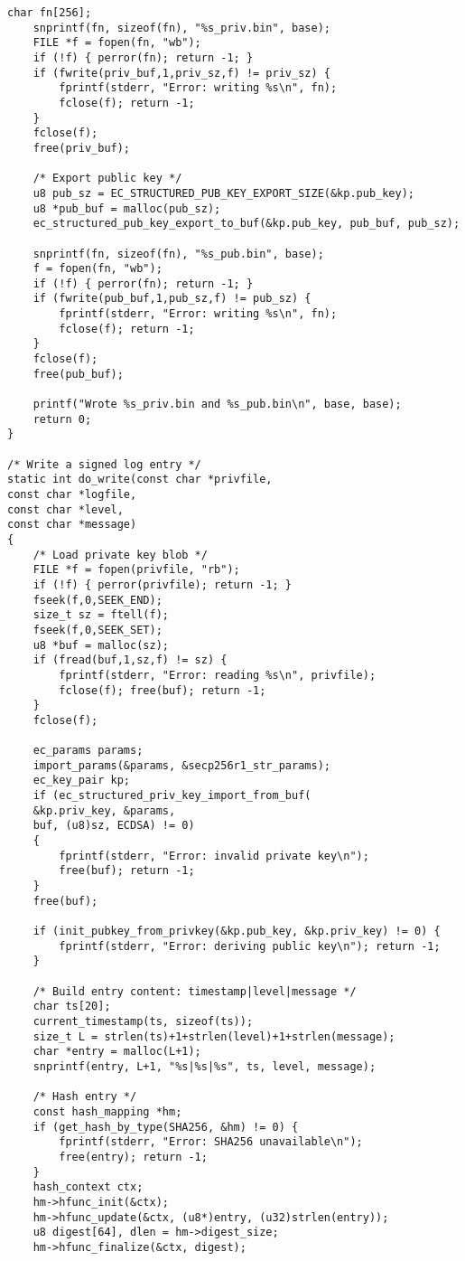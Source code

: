 \begin{lstlisting}[style=cstyle]
	char fn[256];
	snprintf(fn, sizeof(fn), "%s_priv.bin", base);
	FILE *f = fopen(fn, "wb");
	if (!f) { perror(fn); return -1; }
	if (fwrite(priv_buf,1,priv_sz,f) != priv_sz) {
		fprintf(stderr, "Error: writing %s\n", fn);
		fclose(f); return -1;
	}
	fclose(f);
	free(priv_buf);
	
	/* Export public key */
	u8 pub_sz = EC_STRUCTURED_PUB_KEY_EXPORT_SIZE(&kp.pub_key);
	u8 *pub_buf = malloc(pub_sz);
	ec_structured_pub_key_export_to_buf(&kp.pub_key, pub_buf, pub_sz);
	
	snprintf(fn, sizeof(fn), "%s_pub.bin", base);
	f = fopen(fn, "wb");
	if (!f) { perror(fn); return -1; }
	if (fwrite(pub_buf,1,pub_sz,f) != pub_sz) {
		fprintf(stderr, "Error: writing %s\n", fn);
		fclose(f); return -1;
	}
	fclose(f);
	free(pub_buf);
	
	printf("Wrote %s_priv.bin and %s_pub.bin\n", base, base);
	return 0;
}

/* Write a signed log entry */
static int do_write(const char *privfile,
const char *logfile,
const char *level,
const char *message)
{
	/* Load private key blob */
	FILE *f = fopen(privfile, "rb");
	if (!f) { perror(privfile); return -1; }
	fseek(f,0,SEEK_END);
	size_t sz = ftell(f);
	fseek(f,0,SEEK_SET);
	u8 *buf = malloc(sz);
	if (fread(buf,1,sz,f) != sz) {
		fprintf(stderr, "Error: reading %s\n", privfile);
		fclose(f); free(buf); return -1;
	}
	fclose(f);
	
	ec_params params;
	import_params(&params, &secp256r1_str_params);
	ec_key_pair kp;
	if (ec_structured_priv_key_import_from_buf(
	&kp.priv_key, &params,
	buf, (u8)sz, ECDSA) != 0)
	{
		fprintf(stderr, "Error: invalid private key\n");
		free(buf); return -1;
	}
	free(buf);
	
	if (init_pubkey_from_privkey(&kp.pub_key, &kp.priv_key) != 0) {
		fprintf(stderr, "Error: deriving public key\n"); return -1;
	}
	
	/* Build entry content: timestamp|level|message */
	char ts[20];
	current_timestamp(ts, sizeof(ts));
	size_t L = strlen(ts)+1+strlen(level)+1+strlen(message);
	char *entry = malloc(L+1);
	snprintf(entry, L+1, "%s|%s|%s", ts, level, message);
	
	/* Hash entry */
	const hash_mapping *hm;
	if (get_hash_by_type(SHA256, &hm) != 0) {
		fprintf(stderr, "Error: SHA256 unavailable\n");
		free(entry); return -1;
	}
	hash_context ctx;
	hm->hfunc_init(&ctx);
	hm->hfunc_update(&ctx, (u8*)entry, (u32)strlen(entry));
	u8 digest[64], dlen = hm->digest_size;
	hm->hfunc_finalize(&ctx, digest);
	

\end{lstlisting}
